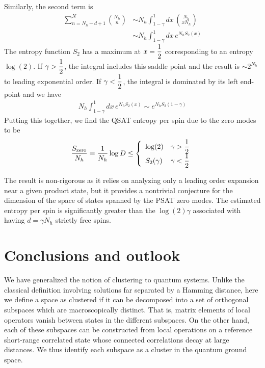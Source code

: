 \documentclass[aps,pra,twocolumn,superscriptaddress,amsmath]{revtex4-1}
\newcommand{\f}[2]{{\ensuremath{\mathchoice%
       {\dfrac{#1}{#2}}
       {\dfrac{#1}{#2}}
       {\frac{#1}{#2}}
       {\frac{#1}{#2}}
       }}}
\begin{document}
Similarly, the second term is 
\begin{align}
	\sum_{n=N_{h}-d+1}^N \binom{N_{h}}{n} &\sim N_{h} \int_{1-\gamma}^1 dx\, \binom{N_{h}}{xN_{h}} \nonumber \\
	&\sim N_{h} \int_{1-\gamma}^1 dx\, e^{N_{h} S_2(x)}
\end{align}
The entropy function $S_2$ has a maximum at $x=\f{1}{2}$ corresponding to an entropy $\log(2)$. If $\gamma > \f{1}{2}$, the integral includes this saddle point and the result is $\sim 2^{N_{h}}$ to leading exponential order. If $\gamma < \f{1}{2}$, the integral is dominated by its left end-point and we have
\begin{align}
	N_{h} \int_{1-\gamma}^1 dx\, e^{N_{h} S_2(x)}\sim e^{N_{h} S_2(1-\gamma)} 
\end{align}
Putting this together, we find the QSAT entropy per spin due to the zero modes to be
\begin{align}
	\frac{S_{\mathrm{zero}}}{N_h} = \frac{1}{N_h}\log D \le \left\{ \begin{array}{ll} \log(2) & \gamma > \f{1}{2} \\
	S_2(\gamma) & \gamma < \f{1}{2} \end{array}\right.
\end{align}

The result is non-rigorous as it relies on analyzing only a leading order expansion near a given product state, but it provides a nontrivial conjecture for the dimension of the space of states spanned by the PSAT zero modes. The estimated entropy per spin is significantly greater than the $\log(2) \gamma$ associated with having $d=\gamma N_{h}$ strictly free spins. 


\section{Conclusions and outlook\label{sec:conclusion}}
We have generalized the notion of clustering to quantum systems. 
Unlike the classical definition involving solutions far separated by a Hamming distance, here we define a space as clustered if it can be decomposed into a set of orthogonal subspaces which are macroscopically distinct.
That is, matrix elements of local operators vanish between states in the different subspaces. 
On the other hand, each of these subspaces can be constructed from local operations on a reference short-range correlated state whose connected correlations decay at large distances.
We thus identify each subspace as a cluster in the quantum ground space.
\end{document}
